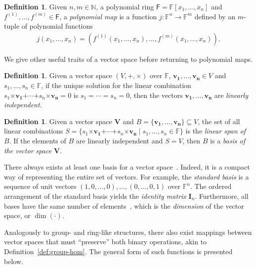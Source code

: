 \documentclass[12pt, a4paper, oneside]{memoir}
\theoremstyle{definition}
\newtheorem{definition}[theorem]{Definition}
\begin{document}
\begin{definition}\label{def:poly-map}
  Given $n, m \in \mathbb{N}$, a polynomial ring $\mathsf{F} = \mathbb{F}[x_{1}, \dots, x_{n}]$ and $f^{(1)}, \dots, f^{(m)} \in \mathsf{F}$, a \emph{polynomial map} is a function $j : \mathbb{F}^{n} \to \mathbb{F}^{m}$ defined by an $m$-tuple of polynomial functions
  \begin{align}
    j(x_{1}, \dots, x_{n}) = (f^{(1)}(x_{1}, \dots, x_{n}), \dots, f^{(m)}(x_{1}, \dots, x_{n})).
  \end{align}
\end{definition}

We give other useful traits of a vector space before returning to polynomial maps.

\begin{definition}
  Given a vector space $(V, \bm{+}, \bm{\times})$ over $\mathbb{F}$, $\mathbf{v_{1}}, \dots, \mathbf{v_{n}} \in V$ and $s_{1}, \dots, s_{n} \in \mathbb{F}$, if the unique solution for the linear combination $s_{1} \bm{\times} \mathbf{v_{1}} \bm{+} \cdots \bm{+} s_{n} \bm{\times} \mathbf{v_{n}} = 0$ is $s_{1} = \cdots = s_{n} = 0$, then the vectors $\mathbf{v_{1}}, \dots, \mathbf{v_{n}}$ are \emph{linearly independent}.
\end{definition}

\begin{definition}
  Given a vector space $\mathbf{V}$ and $B = \{\mathbf{v_{1}}, \dots, \mathbf{v_{n}}\} \subseteq V$, the set of all linear combinations $S = \{ s_{1} \bm{\times} \mathbf{v_{1}} \bm{+} \cdots \bm{+} s_{n} \bm{\times} \mathbf{v_{n}} \mid s_{1}, \dots, s_{n} \in \mathbb{F} \}$ is the \emph{linear span of $B$}. If the elements of $B$ are linearly independent and $S = V$, then $B$ is a \emph{basis of the vector space $\mathbf{V}$}.
\end{definition}

There always exists at least one basis for a vector space~\cite[p.~409, Prop.~1]{Dummit:2003}. Indeed, it is a compact way of representing the entire set of vectors. For example, the \emph{standard basis} is a sequence of unit vectors $(1, 0, \dots, 0), \dots, (0, \dots, 0, 1)$ over $\mathbb{F}^{n}$. The ordered arrangement of the standard basis yields the \emph{identity matrix} $\mathbf{I}_{n}$. Furthermore, all bases have the same number of elements~\cite[p.~411, Cor.~4]{Dummit:2003}, which is the \emph{dimension} of the vector space, or $\dim(\cdot)$. 

Analogously to group- and ring-like structures, there also exist mappings between vector spaces that must ``preserve'' both binary operations, akin to Definition~\ref{def:group-hom}. The general form of such functions is presented below.
\end{document}
